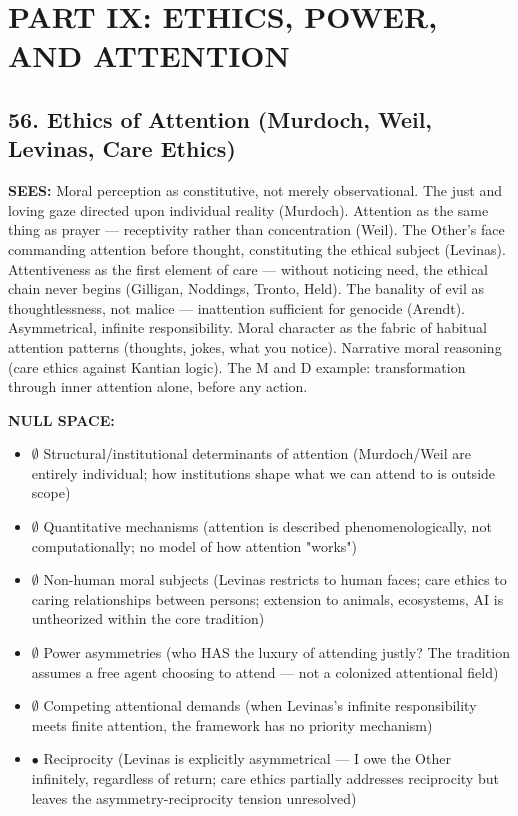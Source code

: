 \section*{PART IX: ETHICS, POWER, AND ATTENTION}


\subsection*{56. Ethics of Attention (Murdoch, Weil, Levinas, Care Ethics)}


\textbf{SEES:} Moral perception as constitutive, not merely observational. The just and loving gaze directed upon individual reality (Murdoch). Attention as the same thing as prayer — receptivity rather than concentration (Weil). The Other's face commanding attention before thought, constituting the ethical subject (Levinas). Attentiveness as the first element of care — without noticing need, the ethical chain never begins (Gilligan, Noddings, Tronto, Held). The banality of evil as thoughtlessness, not malice — inattention sufficient for genocide (Arendt). Asymmetrical, infinite responsibility. Moral character as the fabric of habitual attention patterns (thoughts, jokes, what you notice). Narrative moral reasoning (care ethics against Kantian logic). The M and D example: transformation through inner attention alone, before any action.


\textbf{NULL SPACE:}

\begin{itemize}[nosep,leftmargin=*]
  \item $\emptyset$ Structural/\allowbreak institutional determinants of attention (Murdoch/\allowbreak Weil are entirely individual; how institutions shape what we can attend to is outside scope)
  \item $\emptyset$ Quantitative mechanisms (attention is described phenomenologically, not computationally; no model of how attention "works")
  \item $\emptyset$ Non-human moral subjects (Levinas restricts to human faces; care ethics to caring relationships between persons; extension to animals, ecosystems, AI is untheorized within the core tradition)
  \item $\emptyset$ Power asymmetries (who HAS the luxury of attending justly? The tradition assumes a free agent choosing to attend — not a colonized attentional field)
  \item $\emptyset$ Competing attentional demands (when Levinas's infinite responsibility meets finite attention, the framework has no priority mechanism)
  \item $\bullet$ Reciprocity (Levinas is explicitly asymmetrical — I owe the Other infinitely, regardless of return; care ethics partially addresses reciprocity but leaves the asymmetry-reciprocity tension unresolved)
\end{itemize}


